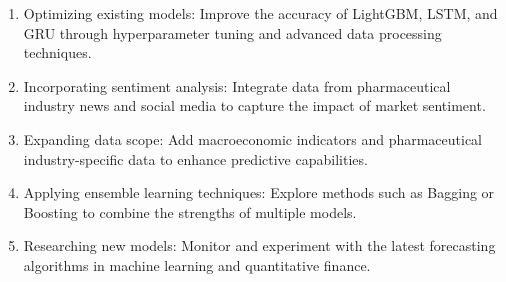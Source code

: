 \documentclass{ieeeojies}
\begin{document}
\begin{enumerate}
    \item Optimizing existing models: Improve the accuracy of LightGBM, LSTM, and GRU through hyperparameter tuning and advanced data processing techniques.
    \item Incorporating sentiment analysis: Integrate data from pharmaceutical industry news and social media to capture the impact of market sentiment.
    \item Expanding data scope: Add macroeconomic indicators and pharmaceutical industry-specific data to enhance predictive capabilities.
    \item Applying ensemble learning techniques: Explore methods such as Bagging or Boosting to combine the strengths of multiple models.
    \item Researching new models: Monitor and experiment with the latest forecasting algorithms in machine learning and quantitative finance.
\end{enumerate}
\end{document}
